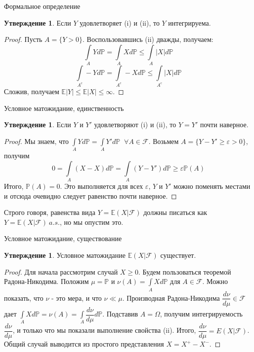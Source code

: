 \documentclass{beamer}%
\theoremstyle{definition}
\newtheorem{proposition}[theorem]{Утверждение}
\renewcommand{\P}{\mathbb{P}}
\newcommand{\F}{\mathcal{F}}
\begin{document}
\begin{frame}{Формальное определение}

\begin{proposition}
Если $Y$ удовлетворяет (i) и (ii), то $Y$ интегрируема.
\end{proposition}
\begin{proof}
Пусть $A=\{Y>0\}$. Воспользовавшись (ii) дважды, получаем:
$$\int\limits_AYd\P=\int\limits_AXd\P\leqslant\int\limits_A|X|d\P$$
$$\int\limits_{A^c}-Yd\P=\int\limits_{A^c}-Xd\P\leqslant\int\limits_{A^c}|X|d\P$$
Сложив, получаем $\mathbb{E}|Y|\leqslant\mathbb{E}|X|\leqslant\infty$.
\end{proof}

\end{frame}


\begin{frame}{Условное матожидание, единственность}

\begin{proposition}
Если $Y$ и $Y'$ удовлетворяют (i) и (ii), то $Y=Y'$ почти наверное.
\end{proposition}
\begin{proof}
Мы знаем, что $\int\limits_AYd\P=\int\limits_AY'd\P \:$ $\forall A\in\F$. Возьмем $A=\{Y-Y'\geqslant\varepsilon>0\}$, получим
$$0=\int\limits_A(X-X)d\P=\int\limits_A(Y-Y')d\P\geqslant\varepsilon\P(A)$$
Итого, $\P(A)=0$. Это выполняется для всех $\varepsilon$, $Y$ и $Y'$ можно поменять местами и отсюда очевидно следует равенство почти наверное.
\end{proof}
Строго говоря, равенства вида $Y=\mathbb{E}(X|\F)$ должны писаться как $Y=\mathbb{E}(X|\F) \: a.s.$, но мы опустим это.

\end{frame}


\begin{frame}{Условное матожидание, существование}

\begin{proposition}
Условное матожидание $\mathbb{E}(X|\F)$ существует.
\end{proposition}
\begin{proof}
Для начала рассмотрим случай $X\geqslant0$. Будем пользоваться теоремой Радона-Никодима. Положим $\mu=\P$ и $\nu(A)=\int\limits_AXd\P$ для $A\in\F$. Можно показать, что $\nu$ - это мера, и что $\nu\ll\mu$. Производная Радона-Никодима $\dfrac{d\nu}{d\mu}\in\F$ дает
$\int\limits_AXd\P=\nu(A)=\int\limits_A\dfrac{d\nu}{d\mu}d\P$.
Подставив $A=\Omega$, получим интегрируемость $\dfrac{d\nu}{d\mu}$, и только что мы показали выполнение свойства (ii). Итого, $\dfrac{d\nu}{d\mu}=E(X|\F)$.
\\
Общий случай выводится из простого представления $X=X^+-X^-$.
\end{proof}

\end{frame}
\end{document}
